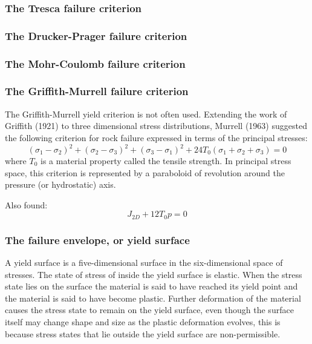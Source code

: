 \subsubsection{The Tresca failure criterion}


\subsubsection{The Drucker-Prager failure criterion}


\subsubsection{The Mohr-Coulomb failure criterion}


\subsubsection{The Griffith-Murrell failure criterion}

The Griffith-Murrell yield criterion \cite{brau94,brbe95,babr97} is not often used. 
Extending the work of Griffith (1921) to three dimensional stress distributions, 
Murrell (1963) suggested the following criterion for rock failure expressed 
in terms of the principal stresses:
\[
(\sigma_1-\sigma_2)^2 + (\sigma_2-\sigma_3)^2 + (\sigma_3-\sigma_1)^2
+
24T_0 (\sigma_1+\sigma_2+\sigma_3)=0
\]
where $T_0$ is a material property called the tensile strength. In principal stress space, 
this criterion is represented by a paraboloid of revolution around the pressure (or hydrostatic) axis.

Also found:
\[
J_{2D}+12 T_0 p =0
\]

\subsubsection{The failure envelope, or yield surface} 


A yield surface is a five-dimensional surface in the six-dimensional space of stresses. 
The state of stress of inside the yield surface is elastic. 
When the stress state lies on the surface the material is said to have reached its yield point 
and the material is said to have become plastic. Further deformation of the material causes 
the stress state to remain on the yield surface, even though the surface itself may change shape and 
size as the plastic deformation evolves, this is because stress states that lie outside the yield surface are non-permissible.

